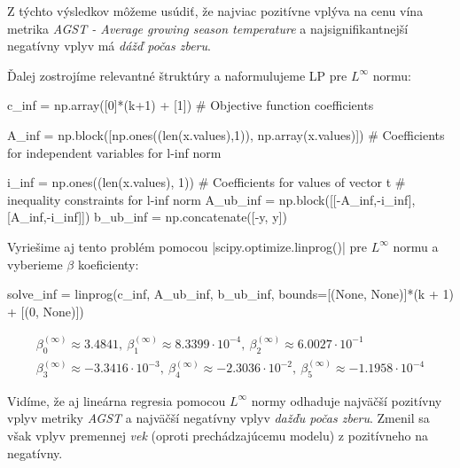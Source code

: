 \documentclass[report.tex]{subfiles}
\begin{document}
Z týchto výsledkov môžeme usúdiť, že najviac pozitívne vplýva na cenu vína metrika \textit{AGST - Average growing season temperature} a najsignifikantnejší negatívny vplyv má \textit{dážď počas zberu}.


Ďalej zostrojíme relevantné štruktúry a naformulujeme LP pre $L^{\infty}$ normu:

\begin{python}
c_inf = np.array([0]*(k+1) + [1]) # Objective function coefficients

A_inf = np.block([np.ones((len(x.values),1)), np.array(x.values)]) # Coefficients for independent variables for l-inf norm

i_inf = np.ones((len(x.values), 1)) # Coefficients for values of vector t 
# inequality constraints for l-inf norm
A_ub_inf = np.block([[-A_inf,-i_inf],[A_inf,-i_inf]])
b_ub_inf = np.concatenate([-y, y]) 
\end{python}

\newpage

Vyriešime aj tento problém pomocou \pyth|scipy.optimize.linprog()| pre $L^{\infty}$ normu a vyberieme $\beta$ koeficienty:

\begin{python}
solve_inf = linprog(c_inf, A_ub_inf, b_ub_inf, bounds=[(None, None)]*(k + 1) + [(0, None)])
\end{python}

\begin{gather*}
	\beta_0^{(\infty)} \approx  3.4841 ,~\beta_1^{(\infty)} \approx 8.3399\cdot 10^{-4} ,~\beta_2^{(\infty)} \approx 6.0027\cdot 10^{-1} \\
	\beta_3^{(\infty)} \approx -3.3416\cdot 10^{-3} ,~\beta_4^{(\infty)} \approx -2.3036\cdot 10^{-2}  ,~\beta_5^{(\infty)} \approx -1.1958\cdot 10^{-4}
\end{gather*}

Vidíme, že aj lineárna regresia pomocou $L^{\infty}$ normy odhaduje najväčší pozitívny vplyv metriky \textit{AGST} a najväčší negatívny vplyv \textit{dažďu počas zberu}. Zmenil sa však vplyv premennej \textit{vek} (oproti prechádzajúcemu modelu) z pozitívneho na negatívny.
\end{document}
